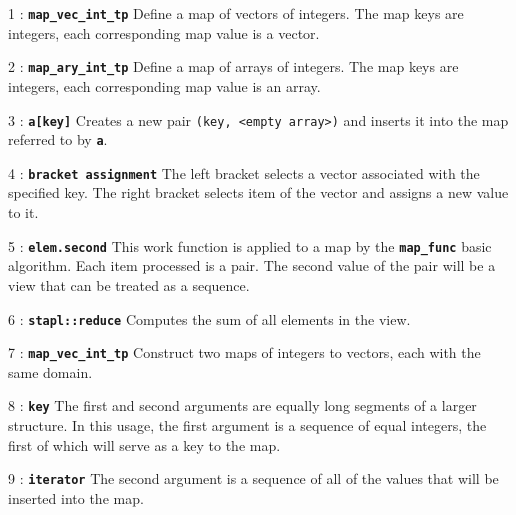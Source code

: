 \documentclass{report}
\begin{document}
\begin{hashitemize}
\item 1 : \texttt{{\bf map\_vec\_int\_tp}}
\newline
Define a map of vectors of integers.  The map keys are integers, each
corresponding map value is a vector.

\item 2 : \texttt{{\bf map\_ary\_int\_tp}}
\newline
Define a map of arrays of integers.  The map keys are integers, each
corresponding map value is an array.

\item 3 : \texttt{{\bf a[key]}}
\newline
Creates a new pair \texttt{(key, <empty array>)} and inserts it into the map
referred to by \texttt{{\bf a}}.

\item 4 : \texttt{{\bf bracket assignment}}
\newline
The left bracket selects a vector associated with the specified key.
The right bracket selects item of the vector and assigns a new value to it.

\item 5 : \texttt{{\bf elem.second}}
\newline
This work function is applied to a map by the
\texttt{{\bf map\_func}}
basic algorithm.  Each item processed is a pair.
The second value of the pair will be a view that can be treated as a sequence.

\item 6 : \texttt{{\bf stapl::reduce}}
\newline
Computes the sum of all elements in the view.

\item 7 : \texttt{{\bf map\_vec\_int\_tp}}
\newline
Construct two maps of integers to vectors, each with the same domain.

\item 8 : \texttt{{\bf key}}
\newline
The first and second arguments are equally long segments of a larger structure. 
In this usage, the first argument is a sequence of equal integers, the first of
which will serve as a key to the map.

\item 9 : \texttt{{\bf iterator}}
\newline
The second argument is a sequence of all of the values that will be inserted 
into the map.


\end{hashitemize}
\end{document}
